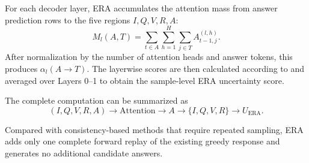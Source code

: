 For each decoder layer, ERA accumulates the attention mass from answer prediction rows to the five regions $I,Q,V,R,A$:
\[
M_l(A,T)
=
\sum_{t\in A}
\sum_{h=1}^{H}
\sum_{j\in T}
A^{(l,h)}_{t-1,j}.
\]
After normalization by the number of attention heads and answer tokens, this produces $\alpha_l(A\rightarrow T)$. The layerwise scores are then calculated according to  and averaged over Layers 0--1 to obtain the sample-level ERA uncertainty score.

The complete computation can be summarized as
\[
(I,Q,V,R,A)
\rightarrow
\text{Attention}
\rightarrow
A\rightarrow\{I,Q,V,R\}
\rightarrow
U_{\mathrm{ERA}}.
\]

Compared with consistency-based methods that require repeated sampling, ERA adds only one complete forward replay of the existing greedy response and generates no additional candidate answers.

